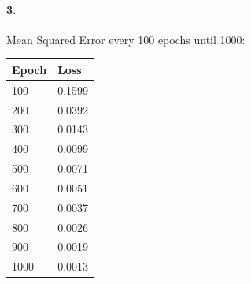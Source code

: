 \documentclass[12pt]{article}
\begin{document}
\paragraph{3.} Mean Squared Error every 100 epochs until 1000:

\begin{center}
\begin{tabular}{ l l }
\label{tab:loss}
    \rowcolor{gray!50}
    \textbf{Epoch} & \textbf{Loss}\\
    \hline
    100 & 0.1599 \\
     200 & 0.0392\\
     300 & 0.0143\\
     400 & 0.0099\\
     500 & 0.0071\\
     600 & 0.0051\\
     700 & 0.0037\\
     800 & 0.0026\\
     900 & 0.0019\\
     1000 & 0.0013\\
\end{tabular}
\end{center}
\end{document}

